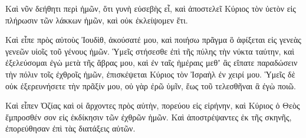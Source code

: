 {Καὶ νῦν δεήθητι περὶ ἡμῶν, ὅτι γυνὴ εὐσεβὴς εἶ, καὶ ἀποστελεῖ Κύριος τὸν ὑετὸν εἰς πλήρωσιν τῶν λάκκων ἡμῶν, καὶ οὐκ ἐκλείψομεν ἔτι.
\par }{\PP {}Καὶ εἶπε πρὸς αὐτοὺς Ἰουδὶθ, ἀκούσατέ μου, καὶ ποιήσω πρᾶγμα ὃ ἀφίξεται εἰς γενεὰς γενεῶν υἱοῖς τοῦ γένους ἡμῶν.
Ὑμεῖς στήσεσθε ἐπὶ τῆς πύλης τὴν νύκτα ταύτην, καὶ ἐξελεύσομαι ἐγὼ μετὰ τῆς ἅβρας μου, καὶ ἐν ταῖς ἡμέραις μεθʼ ἃς εἴπατε παραδώσειν τὴν πόλιν τοῖς ἐχθροῖς ἡμῶν, ἐπισκέψεται Κύριος τὸν Ἰσραὴλ ἐν χειρί μου.
Ὑμεῖς δὲ οὐκ ἐξερευνήσετε τὴν πρᾶξίν μου, οὐ γὰρ ἐρῶ ὑμῖν, ἕως τοῦ τελεσθῆναι ἃ ἐγὼ ποιῶ.
\par }{\PP {}Καὶ εἶπεν Ὀζίας καὶ οἱ ἄρχοντες πρὸς αὐτὴν, πορεύου εἰς εἰρήνην, καὶ Κύριος ὁ Θεὸς ἔμπροσθέν σον εἰς ἐκδίκησιν τῶν ἐχθρῶν ἡμῶν.
Καὶ ἀποστρέψαντες ἐκ τῆς σκηνῆς, ἐπορεύθησαν ἐπὶ τὰς διατάξεις αὐτῶν.

}
